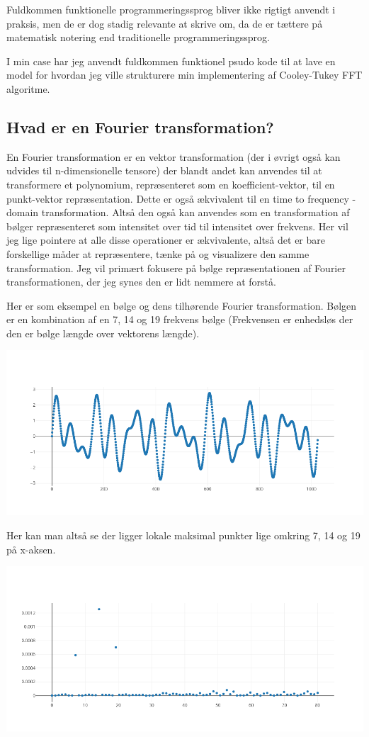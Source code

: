 \documentclass[11pt,a4paper]{article}
\begin{document}
Fuldkommen funktionelle programmeringssprog bliver ikke rigtigt anvendt i praksis,
men de er dog stadig relevante at skrive om, da de er tættere på matematisk notering
end traditionelle programmeringssprog.

I min case har jeg anvendt fuldkommen funktionel psudo kode til at lave en model
for hvordan jeg ville strukturere min implementering af Cooley-Tukey FFT algoritme.

\subsection{Hvad er en Fourier transformation?}
\label{sec:org86f671a}
\newpage

En Fourier transformation er en vektor transformation (der i øvrigt også kan udvides til n-dimensionelle tensore)
der blandt andet kan anvendes til at transformere et polynomium,
repræsenteret som en koefficient-vektor, til en punkt-vektor repræsentation.
Dette er også ækvivalent til en time to frequency -domain transformation.
Altså den også kan anvendes som en transformation af bølger repræsenteret som intensitet over tid til intensitet over frekvens.
Her vil jeg lige pointere at alle disse operationer er ækvivalente, altså det er bare forskellige måder at repræsentere, tænke på og visualizere den samme transformation.
Jeg vil primært fokusere på bølge repræsentationen af Fourier transformationen, der jeg synes den er lidt nemmere at forstå.

Her er som eksempel en bølge og dens tilhørende Fourier transformation.
Bølgen er en kombination af en 7, 14 og 19 frekvens bølge (Frekvensen er enhedsløs der den er bølge længde over vektorens længde).

\begin{center}
\includegraphics[width=.9\linewidth]{./source_plot2.png}
\end{center}

Her kan man altså se der ligger lokale maksimal punkter lige omkring 7, 14 og 19 på x-aksen.
\begin{center}
\includegraphics[width=.9\linewidth]{./plot2.png}
\end{center}
\end{document}

